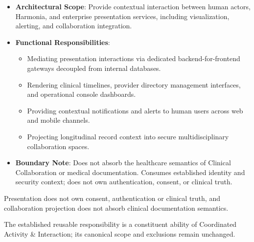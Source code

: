 
\begin{itemize}

\item
\textbf{Architectural Scope}: Provide contextual interaction between human actors, Harmonia, and enterprise presentation services, including visualization, alerting, and collaboration integration.



\item
\textbf{Functional Responsibilities}:


\begin{itemize}

\item
Mediating presentation interactions via dedicated backend-for-frontend gateways decoupled from internal databases.



\item
Rendering clinical timelines, provider directory management interfaces, and operational console dashboards.



\item
Providing contextual notifications and alerts to human users across web and mobile channels.



\item
Projecting longitudinal record context into secure multidisciplinary collaboration spaces.



\end{itemize}


\item
\textbf{Boundary Note}: Does not absorb the healthcare semantics of Clinical Collaboration or medical documentation. Consumes established identity and security context; does not own authentication, consent, or clinical truth.



\end{itemize}


Presentation does not own consent, authentication or clinical truth, and collaboration projection does not absorb clinical documentation semantics.



The established reusable responsibility is a constituent ability of Coordinated Activity \& Interaction; its canonical scope and exclusions remain unchanged.


